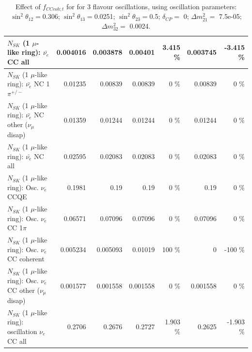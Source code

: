 \begin{table}
\begin{tabular}{| l | r | r | r  r | r  r |}
                            $N_{SK}$ (1 $\mu$-like ring): $\bar{\nu_{e}}$ CC all &        0.004016 &        0.003878 &         0.00401 &    3.415 \%  &        0.003745 &   -3.415 \%  \\ 
\hline
                     $N_{SK}$ (1 $\mu$-like ring): $\bar{\nu_e}$ NC 1$\pi^{+/-}$ &         0.01235 &         0.00839 &         0.00839 &        0 \%  &         0.00839 &        0 \%  \\ 
          $N_{SK}$ (1 $\mu$-like ring): $\bar{\nu_e}$ NC other ($\nu_\mu$ disap) &         0.01359 &         0.01244 &         0.01244 &        0 \%  &         0.01244 &        0 \%  \\ 
                            $N_{SK}$ (1 $\mu$-like ring): $\bar{\nu_{e}}$ NC all &         0.02595 &         0.02083 &         0.02083 &        0 \%  &         0.02083 &        0 \%  \\ 
\hline
\hline
\hline
                                 $N_{SK}$ (1 $\mu$-like ring): Osc. $\nu_e$ CCQE &          0.1981 &            0.19 &            0.19 &        0 \%  &            0.19 &        0 \%  \\ 
                            $N_{SK}$ (1 $\mu$-like ring): Osc. $\nu_e$ CC 1$\pi$ &         0.06571 &         0.07096 &         0.07096 &        0 \%  &         0.07096 &        0 \%  \\ 
                          $N_{SK}$ (1 $\mu$-like ring): Osc. $\nu_e$ CC coherent &        0.005234 &        0.005093 &         0.01019 &      100 \%  &               0 &     -100 \%  \\ 
           $N_{SK}$ (1 $\mu$-like ring): Osc. $\nu_e$ CC other ($\nu_\mu$ disap) &        0.001577 &        0.001558 &        0.001558 &        0 \%  &        0.001558 &        0 \%  \\ 
                        $N_{SK}$ (1 $\mu$-like ring): oscillation $\nu_e$ CC all &          0.2706 &          0.2676 &          0.2727 &    1.903 \%  &          0.2625 &   -1.903 \%  \\ 
\hline
\hline
\end{tabular}
\caption{ Effect of $f_{CCcoh; t}$ for for 3 flavour oscillations, using oscillation parameters:  $\sin^2\theta_{12} = $0.306; $\sin^2\theta_{13} = $0.0251; $\sin^2\theta_{23} = $0.5; $\delta_{CP} = $        0; $\Delta m^2_{21} = $    7.5e-05; $\Delta m^2_{32} = $    0.0024. }
\label{tab:num_xsec_norm_cccoh_1RmuT_3f_osc_t13:0.0251}
\end{table}
\clearpage
